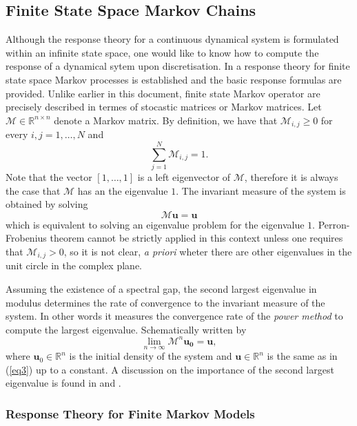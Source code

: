 \subsection*{Finite State Space Markov Chains}

Although the response theory for a continuous dynamical system is formulated within an infinite state space, one would like to know how to compute the response of a dynamical sytem upon discretisation. In \cite{lucarini} a response theory for finite state space Markov processes is established and the basic response formulas are provided. Unlike earlier in this document, finite state Markov operator are precisely described in termes of stocastic matrices or Markov matrices. Let $\mathcal{M}\in \mathbb{R}^{n \times n}$ denote a Markov matrix. By definition, we have that $\mathcal{M}_{i,j}\geq 0$ for every $i,j=1,\ldots,N$ and
\begin{equation*}
	\sum _{j=1}^{N}\mathcal{M}_{i,j}=1.
\end{equation*}
Note that the vector $[1,\ldots , 1]$ is a left eigenvector of $\mathcal{M}$, therefore it is always the case that $\mathcal{M}$ has an the eigenvalue $1$. The invariant measure of the system is obtained by solving
\begin{equation}\label{eq3}
	\mathcal{M}\mathbf{u}=\mathbf{u}
\end{equation}
which is equivalent to solving an eigenvalue problem for the eigenvalue $1$. Perron-Frobenius theorem \cite{lasota} cannot be strictly applied in this context unless one requires that $\mathcal{M}_{i,j}> 0$, so it is not clear, \emph{a priori} wheter there are other eigenvalues in the unit circle in the complex plane. 

Assuming the existence of a spectral gap, the second largest eigenvalue in modulus determines the rate of convergence to the invariant measure of the system. In other words it measures the convergence rate of the \emph{power method} to compute the largest eigenvalue. Schematically written by
\begin{equation}\label{powermethod}
\lim _{n\rightarrow \infty}\mathcal{M}^n\mathbf{u_0} = \mathbf{u},
\end{equation}
where $\mathbf{u}_0 \in \mathbb{R}^n$ is the initial density of the system and $\mathbf{u}\in \mathbb{R}^n$ is the same as in (\ref{eq3}) up to a constant. A discussion on the importance of the second largest eigenvalue is found in \cite{dobrushin} and \cite{lucarini}.

\subsubsection{Response Theory for Finite Markov Models}


